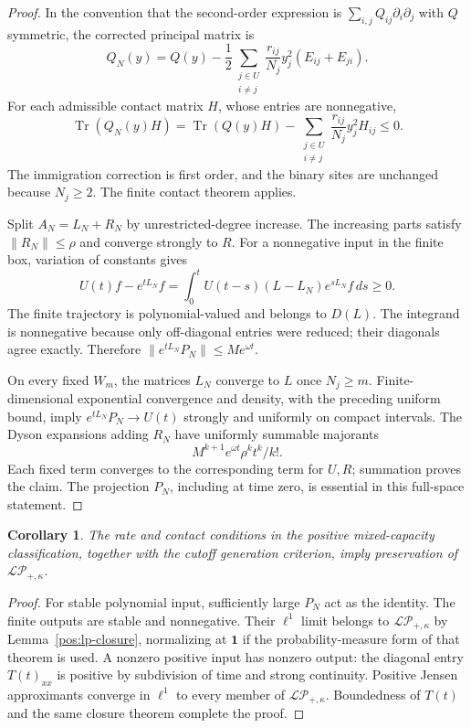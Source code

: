\documentclass[reqno]{amsart}
\newtheorem{corollary}[theorem]{Corollary}
\theoremstyle{definition}
\theoremstyle{remark}
\DeclareMathOperator{\Tr}{Tr}
\begin{document}
\begin{proof}
In the convention that the second-order expression is
\(\sum_{i,j}Q_{ij}\partial_i\partial_j\) with \(Q\) symmetric, the corrected
principal matrix is
\[
 Q_N(y)=Q(y)-
 \frac12\sum_{\substack{j\in U\\i\ne j}}
 \frac{r_{ij}}{N_j}y_j^2(E_{ij}+E_{ji}).
\]
For each admissible contact matrix \(H\), whose entries are nonnegative,
\[
 \Tr(Q_N(y)H)=\Tr(Q(y)H)
       -\sum_{\substack{j\in U\\i\ne j}}
                 \frac{r_{ij}}{N_j}y_j^2H_{ij}\le0.
\]
The immigration correction is first order, and the binary sites are
unchanged because \(N_j\ge2\).  The finite contact theorem applies.

Split \(A_N=L_N+R_N\) by unrestricted-degree increase.  The increasing
parts satisfy \(\|R_N\|\le\rho\) and converge strongly to \(R\).
For a nonnegative input in the finite box, variation of constants gives
\[
 U(t)f-e^{tL_N}f
 =\int_0^tU(t-s)(L-L_N)e^{sL_N}f\,ds\ge0.
\]
The finite trajectory is polynomial-valued and belongs to \(D(L)\).
The integrand is nonnegative because only off-diagonal entries were
reduced; their diagonals agree exactly.  Therefore
\(\|e^{tL_N}P_N\|\le Me^{\omega t}\).

On every fixed \(W_m\), the matrices \(L_N\) converge to \(L\) once
\(N_j\ge m\).  Finite-dimensional exponential convergence and density,
with the preceding uniform bound, imply
\(e^{tL_N}P_N\to U(t)\) strongly and uniformly on compact intervals.
The Dyson expansions adding \(R_N\) have uniformly summable majorants
\[
 M^{k+1}e^{\omega t}\rho^k t^k/k!.
\]
Each fixed term converges to the corresponding term for \(U,R\);
summation proves the claim.  The projection \(P_N\), including at time
zero, is essential in this full-space statement.
\end{proof}

\begin{corollary}\label{ana:mixed-sufficiency}
The rate and contact conditions in the positive mixed-capacity
classification, together with the cutoff generation criterion, imply
preservation of \(\mathcal{LP}_{+,\kappa}\).
\end{corollary}
\begin{proof}
For stable polynomial input, sufficiently large \(P_N\) act as the
identity.  The finite outputs are stable and nonnegative.  Their
\(\ell^1\) limit belongs to \(\mathcal{LP}_{+,\kappa}\) by
Lemma~\ref{pos:lp-closure}, normalizing at \(\mathbf1\) if the probability-measure
form of that theorem is used.  A nonzero positive input has nonzero
output: the diagonal entry \(T(t)_{xx}\) is positive by subdivision of
time and strong continuity.  Positive Jensen approximants converge in
\(\ell^1\) to every member of \(\mathcal{LP}_{+,\kappa}\).
Boundedness of \(T(t)\) and the same closure theorem complete the proof.
\end{proof}
\end{document}
